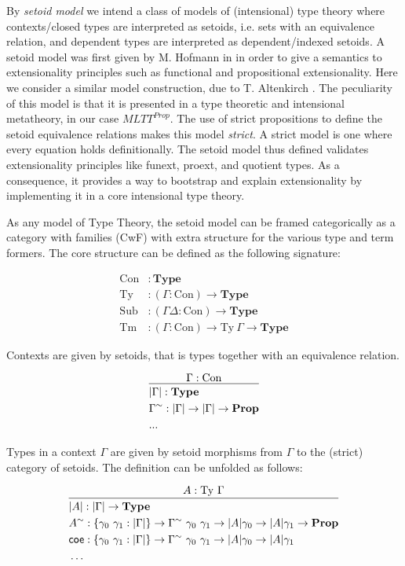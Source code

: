 \documentclass{easychair}
\newcommand{\GG}{\Gamma}
\newcommand{\GD}{\Delta}
\newcommand{\mType}{\mathbf{Type}}
\newcommand{\mProp}{\mathbf{Prop}}
\newcommand{\Con}{\mathrm{Con}}
\newcommand{\Ty}{\mathrm{Ty}}
\newcommand{\Tm}{\mathrm{Tm}}
\newcommand{\Sub}{\mathrm{Sub}}
\begin{document}
By \emph{setoid model} we intend a class of models of (intensional) type theory
where contexts/closed types are interpreted as setoids, i.e. sets with an
equivalence relation, and dependent types are interpreted as dependent/indexed
setoids.
%
A setoid model was first given by M. Hofmann in \cite{hofmann-ext-int} in order
to give a semantics to extensionality principles such as functional and
propositional extensionality. Here we consider a similar model construction, due
to T. Altenkirch \cite{setoid-model}.
%
The peculiarity of this model is that it is presented in a type theoretic and
intensional metatheory, in our case $MLTT^{Prop}$.
%
The use of strict propositions to define the setoid equivalence relations makes
this model \emph{strict}. A strict model is one where every equation holds
definitionally. The setoid model thus defined validates extensionality
principles like funext, proext, and quotient types. As a consequence, it
provides a way to bootstrap and explain extensionality by implementing it in a
core intensional type theory.

As any model of Type Theory, the setoid model can be framed categorically as a
category with families (CwF) with extra structure for the various type and term
formers. The core structure can be defined as the following signature:

\begin{align*}
  \Con &: \mType \\
  \Ty &: (\GG : \Con) \to \mType \\
  \Sub &: (\GG \GD : \Con) \to \mType \\
  \Tm &: (\GG : \Con) \to \Ty\ \GG \to \mType
\end{align*}

Contexts are given by setoids, that is types together with an equivalence relation.

\[
\infer{
  \begin{aligned}
    & | \GG | : \mType \\
    & \GG^\sim : | \GG | \to | \GG | \to \mProp \\
    & ...
  \end{aligned}
}{
  \GG : \Con
}
\]

Types in a context $\GG$ are given by setoid morphisms from $\GG$ to the
(strict) category of setoids. The definition can be unfolded as follows:

\[
\infer{
  \begin{aligned}
    & | A | : | \GG | \to \mType \\
    & A^\sim : \{\gamma_0\ \gamma_1 : | \GG |\}
    \to \GG^\sim\ \gamma_0\ \gamma_1 \to | A | \gamma_0 \to | A | \gamma_1 \to \mProp \\
    & \textsf{coe} : \{\gamma_0\ \gamma_1 : | \GG |\} \to \GG^\sim\ \gamma_0\ \gamma_1 \to | A | \gamma_0 \to | A | \gamma_1 \\
    & \dots
  \end{aligned}
}{
  A : \Ty\ \GG
}
\]
\end{document}
